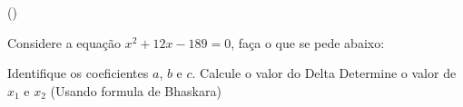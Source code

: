 \begin{question}[type=exam] () %

Considere a equação $x^2+12x-189=0$, faça o que se pede abaixo:
\begin{tasks}
        \task Identifique os coeficientes $a$, $b$ e $c$.
        \task Calcule o valor do Delta
        \task Determine o valor de $x_{1}$ e $x_{2}$ (Usando formula de Bhaskara)
    \end{tasks}
\end{question}